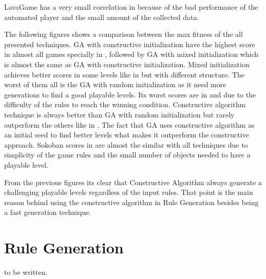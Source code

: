 LavaGame has a very small correlation in  because of the bad performance of the automated player and the small amount of the collected data.


The following figures shows a comparison between the max fitness of the all presented techniques. GA with constructive initialization have the highest score in almost all games specially in , followed by GA with mixed initialization which is almost the same as GA with constructive initialization. Mixed initialization achieves better scores in some levels like in  but with different structure. The worst of them all is the GA with random initialization as it need more generations to find a good playable levels. Its worst scores are in  and  due to the difficulty of the rules to reach the winning condition. Constructive algorithm technique is always better than GA with random initialization but rarely outperform the others like in . The fact that GA uses constructive algorithm as an initial seed to find better levels what makes it outperform the constructive approach. Sokoban scores in  are almost the similar with all techniques due to simplicity of the game rules and the small number of objects needed to have a playable level.






From the previous figures its clear that Constructive Algorithm always generate a challenging playable levels regardless of the input rules. That point is the main reason behind using the constructive algorithm in Rule Generation besides being a fast generation technique.

\section{Rule Generation}
to be written.

